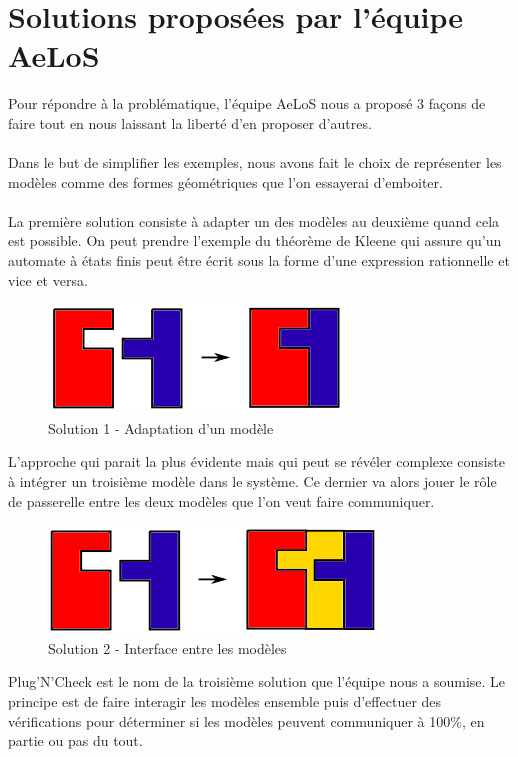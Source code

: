 \documentclass[12pt,a4paper]{report}
\begin{document}
\section{Solutions proposées par l'équipe AeLoS}
Pour répondre à la problématique, l'équipe AeLoS nous a proposé 3 façons de 
faire tout en nous laissant la liberté d'en proposer d'autres.
\\\\
Dans le but de simplifier les exemples, nous avons fait le choix de représenter 
les modèles comme des formes géométriques que l'on essayerai d'emboiter.
\\\\
La première solution consiste à adapter un des modèles au deuxième quand cela 
est possible. On peut prendre l'exemple du théorème de Kleene qui assure qu'un 
automate à états finis peut être écrit sous la forme d'une expression 
rationnelle et vice et versa.

\begin{figure}[h]
	\centering
	\includegraphics[scale=1]{ressources/solution1.png}
	\caption{Solution 1 - Adaptation d'un modèle}
\end{figure}
\newpage
L'approche qui parait la plus évidente mais qui peut se révéler complexe 
consiste à intégrer un troisième modèle dans le système. Ce dernier va alors 
jouer le rôle de passerelle entre les deux modèles que l'on veut faire 
communiquer.

\begin{figure}[h]
	\centering
	\includegraphics[scale=1]{ressources/solution2.png}
	\caption{Solution 2 - Interface entre les modèles}
\end{figure}

Plug'N'Check est le nom de la troisième solution que l'équipe nous a soumise. 
Le principe est de faire interagir les modèles ensemble puis d'effectuer des 
vérifications pour déterminer si les modèles peuvent communiquer à 100\%, 
en partie ou pas du tout.
\end{document}
